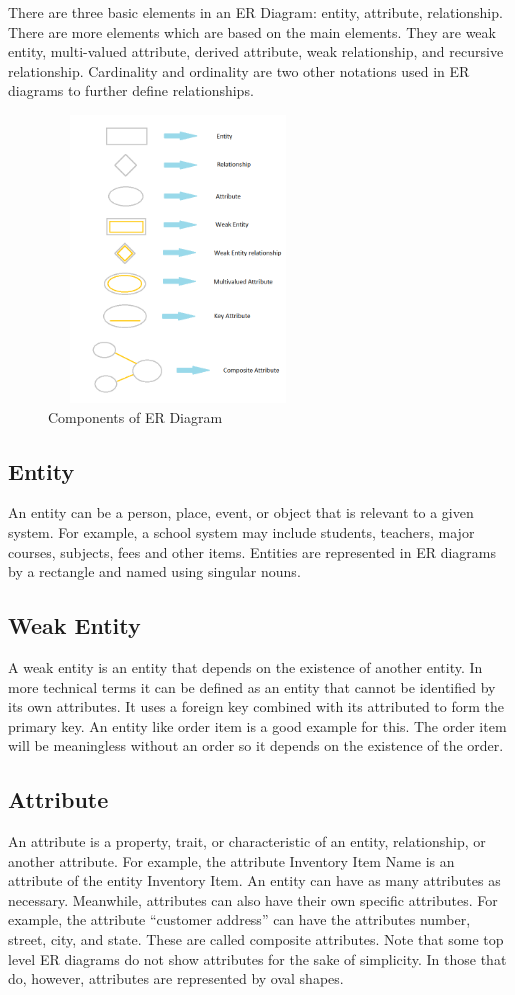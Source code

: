 \documentclass[12pt,a4paper]{report}
\begin{document}
There are three basic elements in an ER Diagram: entity, attribute, relationship. There are more elements which are based on the main elements. They are weak entity, multi-valued attribute, derived attribute, weak relationship, and recursive relationship. Cardinality and ordinality are two other notations used in ER diagrams to further define relationships.

\begin{figure}[hbtp]
\centering
\includegraphics[width=2.7in,height=3in]{../fig/er}
\caption{Components of ER Diagram}
\end{figure}

\subsection{Entity}
An entity can be a person, place, event, or object that is relevant to a given system. For example, a school system may include students, teachers, major courses, subjects, fees and other items. Entities are represented in ER diagrams by a rectangle and named using singular nouns.

\subsection{Weak Entity}
A weak entity is an entity that depends on the existence of another entity. In more technical terms it can be defined as an entity that cannot be identified by its own attributes. It uses a foreign key combined with its attributed to form the primary key. An entity like order item is a good example for this. The order item will be meaningless without an order so it depends on the existence of the order.

\subsection{Attribute}
An attribute is a property, trait, or characteristic of an entity, relationship, or another attribute. For example, the attribute Inventory Item Name is an attribute of the entity Inventory Item. An entity can have as many attributes as necessary. Meanwhile, attributes can also have their own specific attributes. For example, the attribute “customer address” can have the attributes number, street, city, and state. These are called composite attributes. Note that some top level ER diagrams do not show attributes for the sake of simplicity. In those that do, however, attributes are represented by oval shapes.
\end{document}
